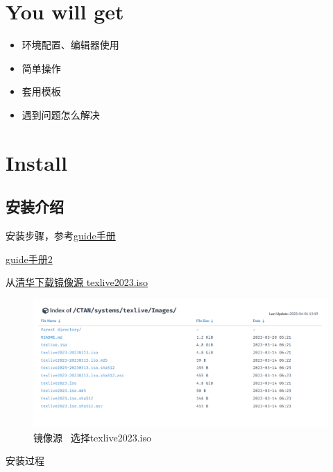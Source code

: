 \documentclass[11pt]{ctexart}
\begin{document}
	
\section{You will get}

\begin{itemize}
	\item 环境配置、编辑器使用
	\item 简单操作
	\item 套用模板
	\item  遇到问题怎么解决
\end{itemize}

\newpage

\section{Install}

\subsection{安装介绍}



安装步骤，参考\href{https://github.com/OsbertWang/install-latex-guide-zh-cn/releases}{guide手册}

\href{https://www.tug.org/texlive/doc/texlive-zh-cn/texlive-zh-cn.pdf}{guide手册2}

从\href{https://mirrors.tuna.tsinghua.edu.cn/CTAN/systems/texlive/Images/}{清华下载镜像源 texlive2023.iso}

\begin{figure}[ht]
	\centering
	\includegraphics[width=1.0\textwidth]{images/texlive2023Images.png}
	\caption{镜像源~ 选择texlive2023.iso}
	\label{fig:2023image}
\end{figure}

安装过程
\end{document}
